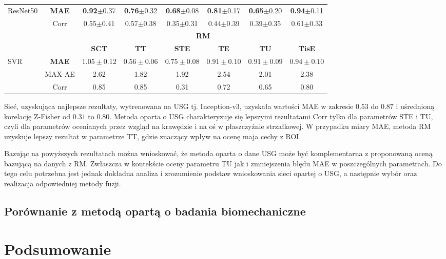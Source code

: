 \begin{table}[h]
\begin{tabular}{lc||c|c|c|c|c|c}
		ResNet50 & \textbf{MAE} & \textbf{0.92}$\pm$0.37 & \textbf{0.76}$\pm$0.32 & \textbf{0.68}$\pm$0.08 & \textbf{0.81}$\pm$0.17 & \textbf{0.65}$\pm$0.20 & \textbf{0.94}$\pm$0.11 \\
		& Corr & 0.55$\pm$0.41 & 0.57$\pm$0.38 & 0.35$\pm$0.31 & 0.44$\pm$0.39 & 0.39$\pm$0.35 & 0.61$\pm$0.33 \\ \hline \hline
				& & \multicolumn{6}{c}{\normalsize{\textbf{RM}}} \\
		& & \textbf{SCT} & \textbf{TT} & \textbf{STE} & \textbf{TE} & \textbf{TU} & \textbf{TisE}\\ \hline
		SVR & \textbf{MAE} & $1.05\pm0.12$ & $0.56\pm0.06$ & $0.75\pm0.08$ & $0.91\pm0.10$ & $0.91\pm0.09$ & $0.94\pm0.10$\\
		& MAX-AE & 2.62 & 1.82 & 1.92 & 2.54 & 2.01 & 2.38 \\
		& Corr   & 0.85 & 0.85 & 0.31 & 0.72 & 0.65 & 0.80 \\
		\hline \hline
	\end{tabular}
\end{table}

Sieć, uzyskująca najlepsze rezultaty, wytrenowana na USG tj. Inception-v3, uzyskała wartości MAE w zakresie $0.53$ do $0.87$ i uśrednioną korelację Z-Fisher od $0.31$ to $0.80$.
Metoda oparta o USG charakteryzuje się lepszymi rezultatami Corr tylko dla parametrów STE i TU, czyli dla parametrów ocenianych przez wzgląd na krawędzie i na oś w płaszczyźnie strzałkowej. W przypadku miary MAE, metoda RM uzyskuje lepszy rezultat w parametrze TT, gdzie znaczący wpływ na ocenę maja cechy z ROI.

Bazując na powyższych rezultatach można wnioskować, że metoda oparta o dane USG może być komplementarna z proponowaną oceną bazującą na danych z RM. Zwłaszcza w kontekście oceny parametru TU jak i zmniejszenia błędu MAE w poszczególnych parametrach. Do tego celu potrzebna jest jednak dokładna analiza i zrozumienie podstaw wnioskowania sieci opartej o USG, a następnie wybór oraz realizacja odpowiedniej metody fuzji.

\section{Porównanie z metodą opartą o badania biomechaniczne}


\chapter{Podsumowanie}




